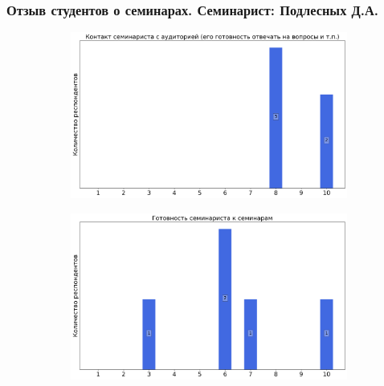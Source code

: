     \subsubsection{Отзыв студентов о семинарах. Семинарист: Подлесных Д.А.}
        \begin{figure}[H]
            \centering
            \begin{subfigure}[b]{0.45\textwidth}
                \centering
                \includegraphics[width=\textwidth]{images/1 course/Информатика/seminarists-marks-Подлесных Д.А.-0.png}
            \end{subfigure}
            \begin{subfigure}[b]{0.45\textwidth}
                \centering
                \includegraphics[width=\textwidth]{images/1 course/Информатика/seminarists-marks-Подлесных Д.А.-1.png}
            \end{subfigure}
            \begin{subfigure}[b]{0.45\textwidth}
                \centering

\end{subfigure}
\end{figure}
